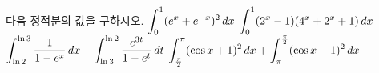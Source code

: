 다음 정적분의 값을 구하시오.
 $\displaystyle\int_{0}^{1}(e^x+e^{-x})^2\mkern3mu dx$
 $\displaystyle\int_{0}^{1}(2^x-1)(4^x+2^x+1)\mkern3mu dx$
 $\displaystyle\int_{\ln 2}^{\ln 3}\dfrac{1}{1-e^x}\mkern3mu dx+\int_{\ln 3}^{\ln 2}\dfrac{e^{3t}}{1-e^t}\mkern3mu dt$
 $\displaystyle\int_{\frac{\pi}{2}}^{\pi}(\cos x+1)^2\mkern3mu dx+\int_{\pi}^{\frac{\pi}{2}}(\cos x-1)^2\mkern3mu dx$
